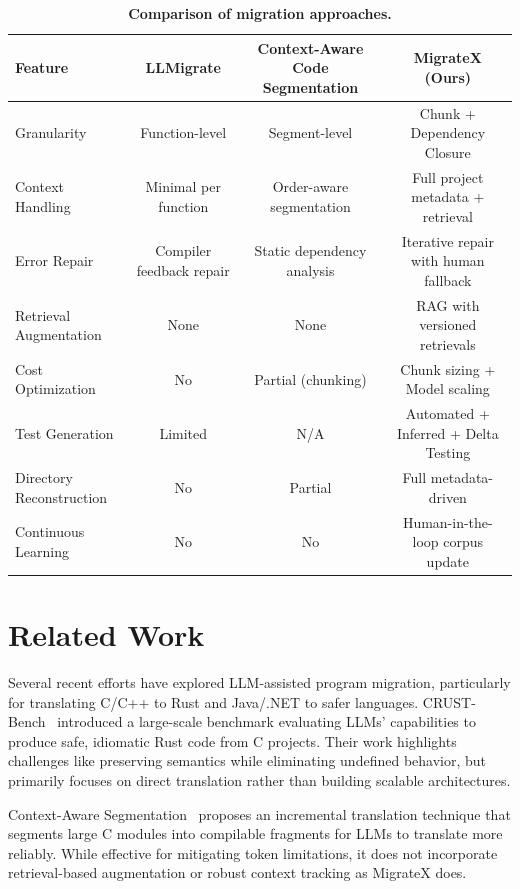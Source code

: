 \documentclass[twocolumn]{article}
\begin{document}
    \begin{table}[htbp]
        \centering
        \caption{\textbf{Comparison of migration approaches.}}
        \label{tab:method_comparison}
        \begin{tabular}{lccc}
        \toprule
        \textbf{Feature} & \textbf{LLMigrate} & \textbf{Context-Aware Code Segmentation} & \textbf{MigrateX (Ours)} \\
        \midrule
        Granularity & Function-level & Segment-level & Chunk + Dependency Closure \\
        Context Handling & Minimal per function & Order-aware segmentation & Full project metadata + retrieval \\
        Error Repair & Compiler feedback repair & Static dependency analysis & Iterative repair with human fallback \\
        Retrieval Augmentation & None & None & RAG with versioned retrievals \\
        Cost Optimization & No & Partial (chunking) & Chunk sizing + Model scaling \\
        Test Generation & Limited & N/A & Automated + Inferred + Delta Testing \\
        Directory Reconstruction & No & Partial & Full metadata-driven \\
        Continuous Learning & No & No & Human-in-the-loop corpus update \\
        \bottomrule
        \end{tabular}
        \end{table}

    \section{Related Work}

    Several recent efforts have explored LLM-assisted program migration, particularly for translating C/C++ to Rust and Java/.NET to safer languages. CRUST-Bench~\cite{khatry2025crust} introduced a large-scale benchmark evaluating LLMs' capabilities to produce safe, idiomatic Rust code from C projects. Their work highlights challenges like preserving semantics while eliminating undefined behavior, but primarily focuses on direct translation rather than building scalable architectures.
    
    Context-Aware Segmentation~\cite{shiraishi2024context} proposes an incremental translation technique that segments large C modules into compilable fragments for LLMs to translate more reliably. While effective for mitigating token limitations, it does not incorporate retrieval-based augmentation or robust context tracking as MigrateX does.
    
\end{document}
